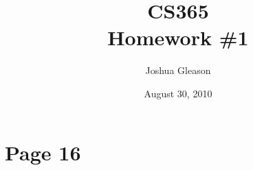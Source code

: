 \documentclass[11pt,a4paper,oneside]{article}
\begin{document}

\title{CS365 \\
       Homework \#1}
\date{August 30, 2010}

\author{Joshua Gleason}

\maketitle
\thispagestyle{empty}

\pagebreak


\section*{Page 16}
\end{document}
